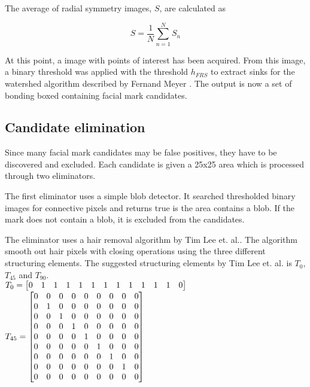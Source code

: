 The average of radial symmetry images, $S$, are calculated as

\begin{equation} \label{eq:M-}
S =\frac{1}{N} \sum_{n=1}^{N} S_n
\end{equation}

At this point, a image with points of interest has been acquired. From this image, a binary threshold was applied with the threshold $h_{FRS}$ to extract sinks for the watershed algorithm described by Fernand Meyer \cite{watershed}. The output is now a set of bonding boxed containing facial mark candidates.

\subsection{Candidate elimination}

Since many facial mark candidates may be false positives, they have to be discovered and excluded. Each candidate is given a 25x25 area which is processed through two eliminators. 

The first eliminator uses a simple blob detector. It searched thresholded binary images for connective pixels and returns true is the area contains a blob. If the mark does not contain a blob, it is excluded from the candidates.   

The eliminator uses a hair removal algorithm by Tim Lee et. al.\cite{dullrazor}. The algorithm smooth out hair pixels with closing operations using the three different structuring elements. The suggested structuring elements by Tim Lee et. al. is $T_{0}$, $T_{45}$ and $T_{90}$. \\

$T_{0} =
\left[ \begin{array}{@{}*{13}{c}@{}}
0 & 1 & 1 & 1 & 1 & 1 & 1 & 1 & 1 & 1 & 1 & 1 & 0  \\
\end{array} \right]  $ \\

$T_{45} =
\left[ \begin{array}{@{}*{9}{c}@{}}
0 & 0 & 0 & 0 & 0 & 0 & 0 & 0 & 0 \\
0 & 1 & 0 & 0 & 0 & 0 & 0 & 0 & 0 \\
0 & 0 & 1 & 0 & 0 & 0 & 0 & 0 & 0 \\
0 & 0 & 0 & 1 & 0 & 0 & 0 & 0 & 0 \\
0 & 0 & 0 & 0 & 1 & 0 & 0 & 0 & 0 \\
0 & 0 & 0 & 0 & 0 & 1 & 0 & 0 & 0 \\
0 & 0 & 0 & 0 & 0 & 0 & 1 & 0 & 0 \\
0 & 0 & 0 & 0 & 0 & 0 & 0 & 1 & 0 \\
0 & 0 & 0 & 0 & 0 & 0 & 0 & 0 & 0 \\
\end{array} \right]$ \\

